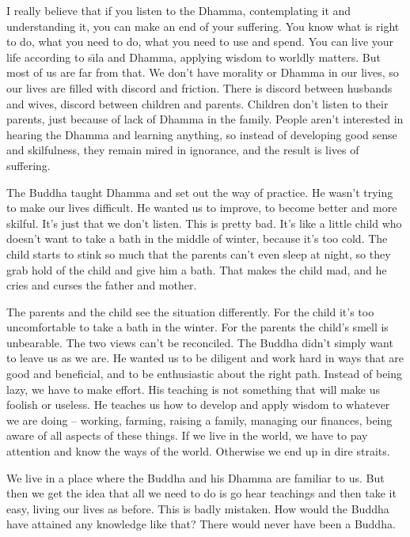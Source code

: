 I really believe that if you listen to the Dhamma, contemplating it and understanding it, you can make an end of your suffering. You know what is right to do, what you need to do, what you need to use and spend. You can live your life according to s\={\i}la and Dhamma, applying wisdom to worldly matters. But most of us are far from that. We don't have morality or Dhamma in our lives, so our lives are filled with discord and friction. There is discord between husbands and wives, discord between children and parents. Children don't listen to their parents, just because of lack of Dhamma in the family. People aren't interested in hearing the Dhamma and learning anything, so instead of developing good sense and skilfulness, they remain mired in ignorance, and the result is lives of suffering. 

The Buddha taught Dhamma and set out the way of practice. He wasn't trying to make our lives difficult. He wanted us to improve, to become better and more skilful. It's just that we don't listen. This is pretty bad. It's like a little child who doesn't want to take a bath in the middle of winter, because it's too cold. The child starts to stink so much that the parents can't even sleep at night, so they grab hold of the child and give him a bath. That makes the child mad, and he cries and curses the father and mother. 

The parents and the child see the situation differently. For the child it's too uncomfortable to take a bath in the winter. For the parents the child's smell is unbearable. The two views can't be reconciled. The Buddha didn't simply want to leave us as we are. He wanted us to be diligent and work hard in ways that are good and beneficial, and to be enthusiastic about the right path. Instead of being lazy, we have to make effort. His teaching is not something that will make us foolish or useless. He teaches us how to develop and apply wisdom to whatever we are doing -- working, farming, raising a family, managing our finances, being aware of all aspects of these things. If we live in the world, we have to pay attention and know the ways of the world. Otherwise we end up in dire straits. 

We live in a place where the Buddha and his Dhamma are familiar to us. But then we get the idea that all we need to do is go hear teachings and then take it easy, living our lives as before. This is badly mistaken. How would the Buddha have attained any knowledge like that? There would never have been a Buddha. 

